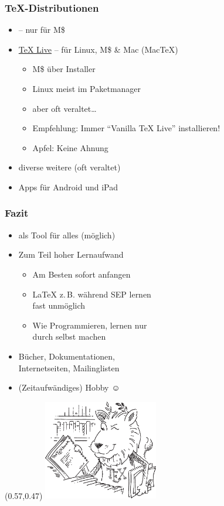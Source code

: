 \documentclass[t,ngerman,compress]{beamer}
\begin{document}
\begin{frame}
  \frametitle{\TeX-Distributionen}
  \begin{itemize}
  \item \href{http://miktex.org}{} – nur für M\$
  \item \href{http://tug.org/texlive}{\TeX{} Live} – für Linux, M\$ \&
    Mac (Mac\TeX)
    \begin{itemize}
    \item M\$ über Installer
    \item Linux meist im Paketmanager
    \item \alert{aber} oft veraltet\dots
    \item Empfehlung: Immer \enquote{Vanilla \TeX{} Live}
      installieren!
    \item Apfel: Keine Ahnung
    \end{itemize}
  \item diverse weitere (oft veraltet)
  \item Apps für Android und iPad
  \end{itemize}
\end{frame}






\begin{frame}
  \frametitle{Fazit}
  \begin{itemize}
  \item {} als Tool für alles (möglich)
  \item Zum Teil hoher Lernaufwand\\
    \begin{itemize}
    \item Am Besten sofort anfangen
    \item \LaTeX{} z.\,B. während SEP lernen\\
      fast unmöglich
    \item Wie Programmieren, lernen nur\\
      durch selbst machen
    \end{itemize}
  \item Bücher, Dokumentationen,\\
    Internetseiten, Mailinglisten
  \item (Zeitaufwändiges) Hobby {\Huge ☺}
  \end{itemize}
  \begin{textblock}{5.5}(0.57,0.47)
    \includegraphics[width=5cm]{lion}~
  \end{textblock}
\end{frame}
\end{document}
